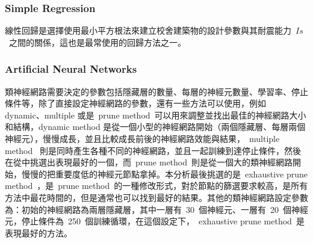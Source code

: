 \subsubsection{Simple Regression}

線性回歸是選擇使用最小平方根法來建立校舍建築物的設計參數與其耐震能力~$Is$~之間的關係，這也是最常使用的回歸方法之一。


\subsubsection{Artificial Neural Networks}

類神經網路需要決定的參數包括隱藏層的數量、每層的神經元數量、學習率、停止條件等，除了直接設定神經網路的參數，還有一些方法可以使用，例如 dynamic、multiple 或是~prune method~可以用來調整並找出最佳的神經網路大小和結構，dynamic method 是從一個小型的神經網路開始（兩個隱藏層、每層兩個神經元），慢慢成長，並且比較成長前後的神經網路效能與結果，~multiple method~ 則是同時產生各種不同的神經網路，並且一起訓練到達停止條件，然後在從中挑選出表現最好的一個，而~prune method~則是從一個大的類神經網路開始，慢慢的把重要度低的神經元節點拿掉。本分析最後挑選的是~exhaustive prune method~，是~prune method~的一種修改形式，對於節點的篩選要求較高，是所有方法中最花時間的，但是通常也可以找到最好的結果。其他的類神經網路設定參數為：初始的神經網路為兩層隱藏層，其中一層有~30~個神經元、一層有~20~個神經元，停止條件為~250~個訓練循環，在這個設定下，~exhaustive prune method~是表現最好的方法。



